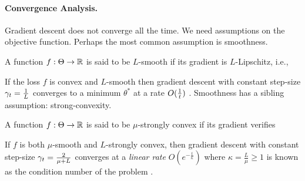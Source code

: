 \paragraph{Convergence Analysis.}
Gradient descent does not converge all the time. 
We need assumptions on the objective function.
Perhaps the most common assumption is smoothness.
\begin{definition}[smoothness]
	A function $f:\Theta \rightarrow\mathbb{R}$ is said to be $L$-smooth if its gradient is $L$-Lipschitz, i.e.,
\end{definition}
If the loss  $f$ is convex and $L$-smooth then gradient descent with constant step-size $\gamma_t = \frac{1}{L}$ converges to a minimum $\theta^*$ at a rate $O(\frac{1}{t})$ \citep[corollary 2.1.2]{nesterov2004Intro}. 
Smoothness has a sibling assumption: strong-convexity.
\begin{definition}
	A function $f:\Theta \rightarrow\mathbb{R}$ is said to be $\mu$-strongly convex if its gradient verifies
\end{definition}
If $f$ is both $\mu$-smooth and $L$-strongly convex, then gradient descent with constant step-size $\gamma_t = \frac{2}{\mu + L}$ converges at a \emph{linear rate} $O(e^{-\frac{t}{\kappa}})$ where $\kappa= \frac{L}{\mu} \geq 1$ is known as the condition number of the problem \citep[theorem 2.1.15]{nesterov2004Intro}.

